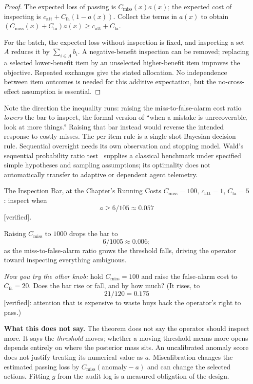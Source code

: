 \documentclass[11pt,a4paper]{article}
\theoremstyle{definition}
\theoremstyle{plain}
\begin{document}
\begin{proof}
\setlength{\parskip}{4pt plus 1pt}
The expected loss of passing is $C_{\mathrm{miss}}(x)a(x)$; the expected cost of
inspecting is $c_{\mathrm{att}}+C_{\mathrm{fa}}(1-a(x))$. Collect the terms in $a(x)$
to obtain $(C_{\mathrm{miss}}(x)+C_{\mathrm{fa}})a(x)\ge
c_{\mathrm{att}}+C_{\mathrm{fa}}$.

For the batch, the expected loss without inspection is fixed, and inspecting
a set $A$ reduces it by $\sum_{i\in A}b_i$. A negative-benefit inspection can
be removed; replacing a selected lower-benefit item by an unselected
higher-benefit item improves the objective. Repeated exchanges give the
stated allocation. No independence between item outcomes is needed for this
additive expectation, but the no-cross-effect assumption is essential.
\end{proof}

Note the direction the inequality runs: raising the miss-to-false-alarm cost ratio
\emph{lowers} the bar to inspect, the formal version of ``when a mistake is
unrecoverable, look at more things.'' Raising that bar instead would reverse the
intended response to costly misses. The per-item rule is a single-shot Bayesian decision rule. Sequential
oversight needs its own observation and stopping model. Wald's sequential
probability ratio test~ supplies a classical benchmark under
specified simple hypotheses and sampling assumptions; its optimality does
not automatically transfer to adaptive or dependent agent telemetry.

\begin{pdexample}{The Inspection Bar, at the Chapter's Running Costs}
\setlength{\parskip}{4pt plus 1pt}
$C_{\mathrm{miss}}{=}100$, $c_{\mathrm{att}}{=}1$, $C_{\mathrm{fa}}{=}5$: inspect when
\[
a\ge 6/105\approx 0.057
\]
[verified].

Raising $C_{\mathrm{miss}}$ to $1000$ drops the
bar to
\[
6/1005\approx 0.006;
\]
as the miss-to-false-alarm ratio grows the threshold
falls, driving the operator toward inspecting everything ambiguous.

\emph{Now you
try the other knob:} hold $C_{\mathrm{miss}}{=}100$ and raise the false-alarm cost
to $C_{\mathrm{fa}}{=}20$. Does the bar rise or fall, and by how much? (It rises,
to
\[
21/120=0.175
\]
[verified]: attention that is expensive to waste buys back the
operator's right to pass.)
\end{pdexample}

\noindent\textbf{What this does not say.} The theorem does not say the operator
should inspect more. It says the \emph{threshold} moves; whether a moving threshold
means more opens depends entirely on where the posterior mass sits. An uncalibrated anomaly score does not justify treating its numerical
value as $a$. Miscalibration changes the estimated passing loss by
$C_{\mathrm{miss}}(\mathrm{anomaly}-a)$ and can change the selected actions.
Fitting $g$ from the audit log is a measured obligation of the design.
\end{document}
